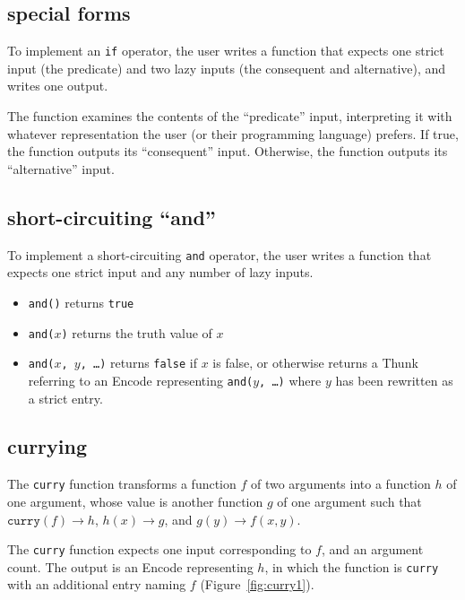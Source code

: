 \documentclass{article}
\newcommand{\encode}{\textrm{Encode}\xspace}
\newcommand{\thunk}{\textrm{Thunk}\xspace}
\newcommand{\bs}{\vspace{\baselineskip}}
\begin{document}
\subsection{special forms} To implement an \texttt{if}
operator, the user writes a function that expects one strict input
(the predicate) and two lazy inputs (the consequent and alternative),
and writes one output.

\bs

The function examines the contents of the ``predicate'' input,
interpreting it with whatever representation the user (or their
programming language) prefers. If true, the function outputs its
``consequent'' input. Otherwise, the function outputs its
``alternative'' input.

\subsection{short-circuiting ``and''} To implement a
short-circuiting \texttt{and} operator, the user writes a function
that expects one strict input and any number of lazy inputs.

\begin{itemize}[itemsep=0pt]
\item \texttt{and()} returns \texttt{true}
\item \texttt{and($x$)} returns the truth value of $x$
\item \texttt{and($x$, $y$, \ldots)} returns \texttt{false} if $x$ is false, or otherwise returns a \thunk referring to an 
\encode representing \texttt{and($y$, \ldots)} where $y$ has been rewritten as a strict entry.
\end{itemize}

\subsection{currying} The \texttt{curry} function transforms
a function $f$ of two arguments into a function $h$ of one argument,
whose value is another function $g$ of one argument such that $\texttt{curry}(f) \rightarrow h$, $h(x) \rightarrow g$, and $g(y) \rightarrow f(x,y)$.

\bs

The \texttt{curry} function expects one input corresponding to $f$,
and an argument count. The output is an \encode representing
$h$, in which the function is \texttt{curry} with an additional entry
naming $f$ (Figure~\ref{fig:curry1}).

\bs
\end{document}
